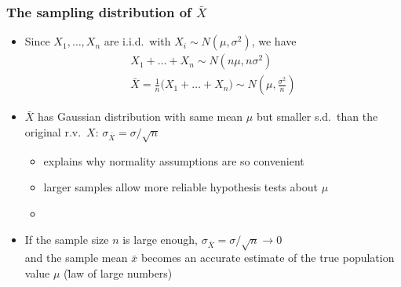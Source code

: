 \documentclass[t]{beamer} %
\begin{document}
\begin{frame}
  \frametitle{The sampling distribution of $\bar{X}$}

  \begin{itemize}
  \item Since $X_1, \ldots, X_n$ are i.i.d.\ with $X_i\sim N(\mu, \sigma^2)$,
    we have
    \begin{gather*}
      X_1 + \dots + X_n \sim N(n \mu, n \sigma^2) \\
      \bar{X} = \frac{1}{n} \bigl( X_1 + \dots + X_n \bigr) 
      \sim N(\mu, \frac{\sigma^2}{n})
    \end{gather*}
  \item $\bar{X}$ has Gaussian distribution with same mean $\mu$ but smaller s.d.\
    than the original r.v.\ $X$: $\sigma_{\bar{X}} = \sigma / \sqrt{n}$
    \begin{itemize}
    \item[\hand] explains why normality assumptions are so convenient
    \item[\hand] larger samples allow more reliable hypothesis tests about $\mu$
    \item[]
    \end{itemize}
    \pause
  \item If the sample size $n$ is large enough, $\sigma_{\bar{X}} = \sigma /
    \sqrt{n} \to 0$\\ and the sample mean $\bar{x}$ becomes an accurate estimate
    of the true population value $\mu$ (\h{law of large numbers})
  \end{itemize}
\end{frame}
\end{document}
